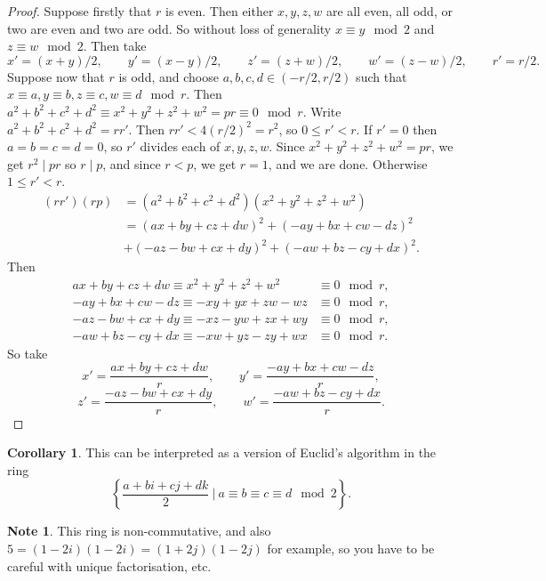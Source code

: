 \documentclass{article}
\newcommand{\rb}[1]{\left( #1 \right)}
\newcommand{\cb}[1]{\left\{ #1 \right\}}
\theoremstyle{definition}\newtheorem{definition}{Definition}
\theoremstyle{definition}\newtheorem*{remark}{Remark}
\theoremstyle{definition}\newtheorem*{example}{Example}
\theoremstyle{definition}\newtheorem*{note}{Note}
\newtheorem{corollary}[definition]{Corollary}
\begin{document}
\begin{proof}
Suppose firstly that $ r $ is even. Then either $ x, y, z, w $ are all even, all odd, or two are even and two are odd. So without loss of generality $ x \equiv y \mod 2 $ and $ z \equiv w \mod 2 $. Then take
$$ x' = \rb{x + y} / 2, \qquad y' = \rb{x - y} / 2, \qquad z' = \rb{z + w} / 2, \qquad w' = \rb{z - w} / 2, \qquad r' = r / 2. $$
Suppose now that $ r $ is odd, and choose $ a, b, c, d \in \rb{-r / 2, r / 2} $ such that $ x \equiv a, y \equiv b, z \equiv c, w \equiv d \mod r $. Then $ a^2 + b^2 + c^2 + d^2 \equiv x^2 + y^2 + z^2 + w^2 = pr \equiv 0 \mod r $. Write $ a^2 + b^2 + c^2 + d^2 = rr' $. Then $ rr' < 4\rb{r / 2}^2 = r^2 $, so $ 0 \le r' < r $. If $ r' = 0 $ then $ a = b = c = d = 0 $, so $ r' $ divides each of $ x, y, z, w $. Since $ x^2 + y^2 + z^2 + w^2 = pr $, we get $ r^2 \mid pr $ so $ r \mid p $, and since $ r < p $, we get $ r = 1 $, and we are done. Otherwise $ 1 \le r' < r $.
\begin{align*}
\rb{rr'}\rb{rp}
& = \rb{a^2 + b^2 + c^2 + d^2}\rb{x^2 + y^2 + z^2 + w^2} \\
& = \rb{ax + by + cz + dw}^2 + \rb{-ay + bx + cw - dz}^2 \\
& + \rb{-az - bw + cx + dy}^2 + \rb{-aw + bz - cy + dx}^2.
\end{align*}
Then
\begin{align*}
ax + by + cz + dw \equiv x^2 + y^2 + z^2 + w^2 & \equiv 0 \mod r, \\
-ay + bx + cw - dz \equiv -xy + yx + zw - wz & \equiv 0 \mod r, \\
-az - bw + cx + dy \equiv -xz - yw + zx + wy & \equiv 0 \mod r, \\
-aw + bz - cy + dx \equiv -xw + yz - zy + wx & \equiv 0 \mod r.
\end{align*}
So take
$$ x' = \dfrac{ax + by + cz + dw}{r}, \qquad y' = \dfrac{-ay + bx + cw - dz}{r}, $$
$$ z' = \dfrac{-az - bw + cx + dy}{r}, \qquad w' = \dfrac{-aw + bz - cy + dx}{r}. $$
\end{proof}

\begin{corollary}
This can be interpreted as a version of Euclid's algorithm in the ring
$$ \cb{\dfrac{a + bi + cj + dk}{2} \ \Bigg| \ a \equiv b \equiv c \equiv d \mod 2}. $$
\end{corollary}

\begin{note}
This ring is non-commutative, and also $ 5 = \rb{1 - 2i}\rb{1 - 2i} = \rb{1 + 2j}\rb{1 - 2j} $ for example, so you have to be careful with unique factorisation, etc.
\end{note}
\end{document}
